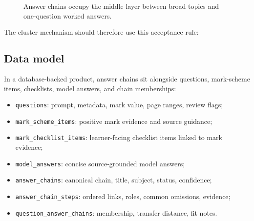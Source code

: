 \documentclass[11pt]{article}
\begin{document}
\begin{figure}[H]
\centering
{}
\caption{Answer chains occupy the middle layer between broad topics and one-question worked answers.}
\label{fig:abstraction}
\end{figure}

The cluster mechanism should therefore use this acceptance rule:


\subsection{Data model}

In a database-backed product, answer chains sit alongside questions, mark-scheme items, checklists, model answers, and chain memberships:

\begin{itemize}
\item \texttt{questions}: prompt, metadata, mark value, page ranges, review flags;
\item \texttt{mark\_scheme\_items}: positive mark evidence and source guidance;
\item \texttt{mark\_checklist\_items}: learner-facing checklist items linked to mark evidence;
\item \texttt{model\_answers}: concise source-grounded model answers;
\item \texttt{answer\_chains}: canonical chain, title, subject, status, confidence;
\item \texttt{answer\_chain\_steps}: ordered links, roles, common omissions, evidence;
\item \texttt{question\_answer\_chains}: membership, transfer distance, fit notes.
\end{itemize}
\end{document}
